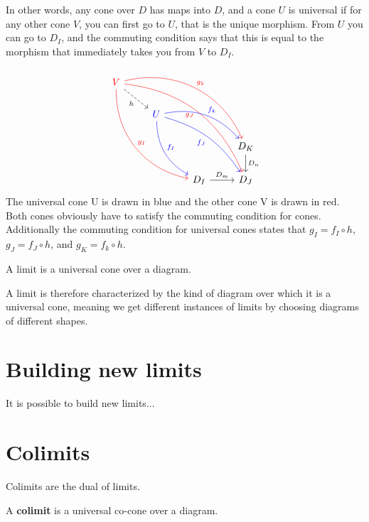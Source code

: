 In other words, any cone over $D$ has maps into $D$, and a cone $U$ is universal if
for any other cone $V$, you can first go to $U$, that is the unique morphism.
From $U$ you can go to $D_I$, and the commuting condition says that this is equal
to the morphism that immediately takes you from $V$ to $D_I$.

\begin{example}
    \[
    \begin{tikzcd}
      {\color{red}V}
      \arrow[bend right=40,color=red]{dddrr}{g_I}
      \arrow[bend left=40, color=red]{ddrrr}{g_k}
      \arrow[bend left=30, color=red, swap]{dddrrr}{g_J}
      \arrow[dashed,swap]{dr}{h}
      & & & \\
      & {\color{blue}U}
      \arrow[bend right=30,color=blue]{ddr}{f_I}
      \arrow[bend left=30, color=blue]{drr}{f_k}
      \arrow[bend left=20, color=blue, swap]{ddrr}{f_J}&   &\\
      & & & D_K \arrow{d}{D_n} \\
      & & D_I \arrow{r}{D_m} & D_J
    \end{tikzcd}
  \]
  The universal cone {\color{blue}U}
  is drawn in blue and the other cone {\color{red}V} is drawn in red.
  Both cones obviously have to satisfy the commuting condition for cones.
  Additionally the commuting condition for universal cones states that
  $g_I = f_I \circ h$, $g_J = f_J \circ h$, and $g_K = f_k \circ h$.
\end{example}

\begin{definition}
  A limit is a universal cone over a diagram.
\end{definition}

A limit is therefore characterized by the kind of diagram
over which it is a universal cone, meaning we get different instances of limits
by choosing diagrams of different shapes.


\chapter{Building new limits}
It is possible to build new limits...

\chapter{Colimits}
Colimits are the dual of limits.
\begin{definition}
  A \textbf{colimit} is a universal co-cone over a diagram.
\end{definition}

